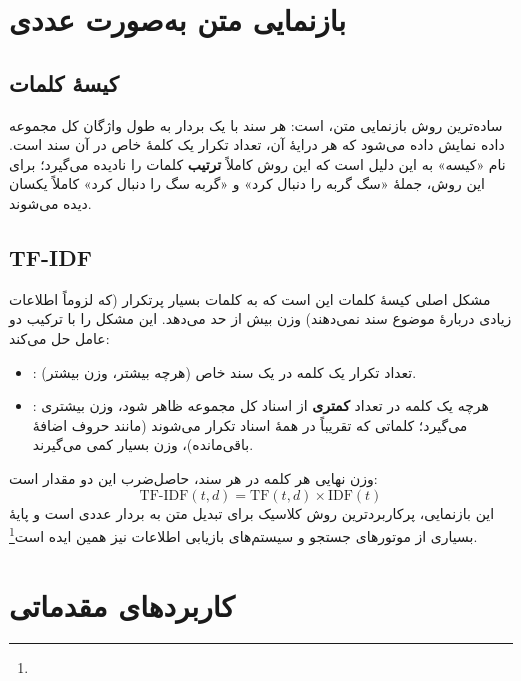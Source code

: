 \section{بازنمایی متن به‌صورت عددی}

\subsection{کیسهٔ کلمات}

ساده‌ترین روش بازنمایی متن،
 است: هر سند با یک
بردار به طول واژگان کل مجموعه داده نمایش داده می‌شود که هر درایهٔ آن،
تعداد تکرار یک کلمهٔ خاص در آن سند است. نام «کیسه» به این دلیل است که
این روش کاملاً \textbf{ترتیب} کلمات را نادیده می‌گیرد؛ برای این روش،
جملهٔ «سگ گربه را دنبال کرد» و «گربه سگ را دنبال کرد» کاملاً یکسان
دیده می‌شوند.

\subsection{TF-IDF}

مشکل اصلی کیسهٔ کلمات این است که به کلمات بسیار پرتکرار (که لزوماً
اطلاعات زیادی دربارهٔ موضوع سند نمی‌دهند) وزن بیش از حد می‌دهد.
این مشکل را با ترکیب دو عامل حل می‌کند:

\begin{itemize}
    \item {}: تعداد
          تکرار یک کلمه در یک سند خاص (هرچه بیشتر، وزن بیشتر).
    \item {}: هرچه یک کلمه در تعداد \textbf{کمتری} از اسناد کل
          مجموعه ظاهر شود، وزن بیشتری می‌گیرد؛ کلماتی که تقریباً در همهٔ
          اسناد تکرار می‌شوند (مانند حروف اضافهٔ باقی‌مانده)، وزن بسیار
          کمی می‌گیرند.
\end{itemize}

وزن نهایی هر کلمه در هر سند، حاصل‌ضرب این دو مقدار است:
\[
\text{TF-IDF}(t, d) = \text{TF}(t, d) \times \text{IDF}(t)
\]
این بازنمایی، پرکاربردترین روش کلاسیک برای تبدیل متن به بردار عددی است
و پایهٔ بسیاری از موتورهای جستجو و سیستم‌های بازیابی اطلاعات
نیز همین ایده است\footnote{}.

\section{کاربردهای مقدماتی}

